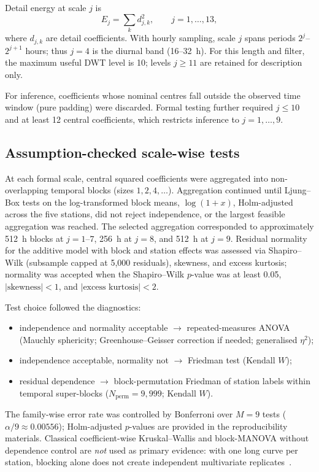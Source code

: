 \documentclass[12pt,letterpaper]{article}
\begin{document}
Detail energy at scale $j$ is
\begin{equation}
  E_j=\sum_{k} d_{j,k}^{2},\qquad j=1,\ldots,13,
  \label{eq:energy}
\end{equation}
where $d_{j,k}$ are detail coefficients. With hourly sampling, scale $j$ spans periods $2^{j}$--$2^{j+1}$ hours; thus $j=4$ is the diurnal band (16--32~h). For this length and filter, the maximum useful DWT level is 10; levels $j\ge 11$ are retained for description only.

For inference, coefficients whose nominal centres fall outside the observed time window (pure padding) were discarded. Formal testing further required $j\le 10$ and at least 12 central coefficients, which restricts inference to $j=1,\ldots,9$.

\subsection{Assumption-checked scale-wise tests}
\label{subsec:tests}

At each formal scale, central squared coefficients were aggregated into non-overlapping temporal blocks (sizes $1,2,4,\ldots$). Aggregation continued until Ljung--Box tests on the log-transformed block means, $\log(1+x)$, Holm-adjusted across the five stations, did not reject independence, or the largest feasible aggregation was reached. The selected aggregation corresponded to approximately 512~h blocks at $j=1$--$7$, 256~h at $j=8$, and 512~h at $j=9$. Residual normality for the additive model with block and station effects was assessed via Shapiro--Wilk (subsample capped at 5{,}000 residuals), skewness, and excess kurtosis; normality was accepted when the Shapiro--Wilk $p$-value was at least 0.05, $|\text{skewness}|<1$, and $|\text{excess kurtosis}|<2$.

Test choice followed the diagnostics:
\begin{itemize}\itemsep2pt
  \item independence and normality acceptable $\rightarrow$ repeated-measures ANOVA (Mauchly sphericity; Greenhouse--Geisser correction if needed; generalised $\eta^{2}$);
  \item independence acceptable, normality not $\rightarrow$ Friedman test (Kendall $W$);
  \item residual dependence $\rightarrow$ block-permutation Friedman of station labels within temporal super-blocks ($N_{\mathrm{perm}}=9{,}999$; Kendall $W$).
\end{itemize}
The family-wise error rate was controlled by Bonferroni over $M=9$ tests ($\alpha/9\approx 0.00556$); Holm-adjusted $p$-values are provided in the reproducibility materials. Classical coefficient-wise Kruskal--Wallis and block-MANOVA without dependence control are \emph{not} used as primary evidence: with one long curve per station, blocking alone does not create independent multivariate replicates~\cite{ma2018,morettin2017}.
\end{document}
